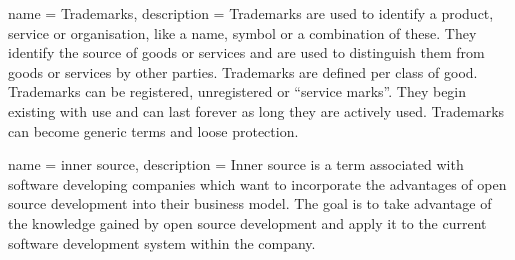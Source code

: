  { name = {Trademarks}, description
 = {Trademarks are used to identify a product, service or organisation, 
    like a name, symbol or a combination of these. They identify the 
    source of goods or services and are used to distinguish them from 
    goods or services by other parties. Trademarks are defined per class 
    of good. Trademarks can be registered, unregistered or “service 
    marks”. They begin existing with use and can last forever as long 
    they are actively used. Trademarks can become generic terms and 
    loose protection.}}

 { name = {inner source}, description =  
  {Inner source is a term associated with software developing companies which 
  want to incorporate the advantages of open source development into their 
  business model. The goal is to take advantage of the knowledge gained by open
  source development and apply it to the current software development system
  within the company.}}
